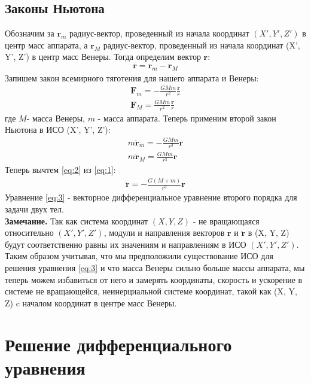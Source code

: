 \documentclass{article}
\begin{document}
    \subsection{Законы Ньютона}
    Обозначим за $\mathbf{r}_m$ радиус-вектор, проведенный из начала координат $(X', Y', Z')$ в центр масс аппарата, а $\mathbf{r}_M$ радиус-вектор, проведенный из начала координат (X', Y', Z') в центр масс Венеры. Тогда определим вектор $\mathbf{r}$:
    \begin{gather}
        \mathbf{r} = \mathbf{r}_m - \mathbf{r}_M
    \end{gather}
    Запишем закон всемирного тяготения для нашего аппарата и Венеры:
   \begin{gather}
        \mathbf{F}_{m}=-\frac{GMm}{r^2}\frac{\mathbf{r}}{r} \\
        \mathbf{F}_{M}=\frac{GMm}{r^2}\frac{\mathbf{r}}{r}
    \end{gather}
    где 
    $M$- масса Венеры, $m$ - масса аппарата. Теперь применим второй закон Ньютона в ИСО (X', Y', Z'):
    \begin{gather}
        m\mathbf{\ddot{r}}_m=-\frac{GMm}{r^3}\mathbf{r} \label{eq:1} \\
        m\mathbf{\ddot{r}}_M=\frac{GMm}{r^3}\mathbf{r} \label{eq:2}
    \end{gather}
    Теперь вычтем \eqref{eq:2} из \eqref{eq:1}:
    \begin{gather}
        \mathbf{\ddot{r}}=-\frac{G(M+m)}{r^3}\mathbf{r} \label{eq:3}
    \end{gather}
    Уравнение \eqref{eq:3} - векторное дифференциальное уравнение второго порядка для задачи двух тел. \\
    \textbf{Замечание.} Так как система координат $(X, Y, Z)$ - не вращающаяся относительно $(X', Y', Z')$, модули и направления векторов $\mathbf{r}$ и $\mathbf{\ddot{r}}$ в (X, Y, Z) будут соответственно равны их значениям и направлениям в ИСО $(X', Y', Z')$. Таким образом учитывая, что мы предположили существование ИСО для решения уравнения \eqref{eq:3} и что масса Венеры сильно больше массы аппарата, мы теперь можем избавиться от него и замерять координаты, скорость и ускорение в системе не вращающейся, неинерциальной системе координат, такой как (X, Y, Z) c началом координат в центре масс Венеры.
    \section{Решение дифференциального уравнения}
\end{document}
